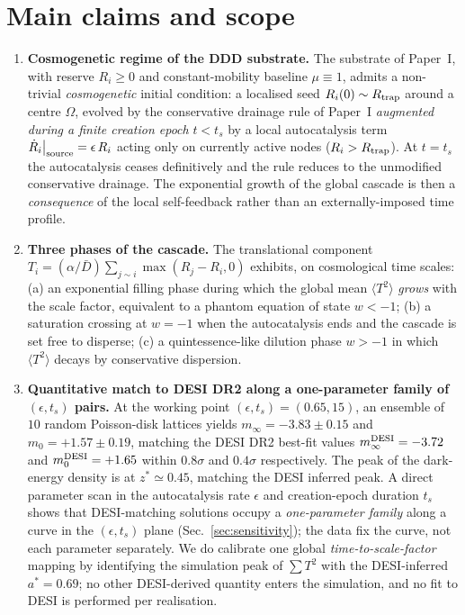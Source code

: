 \documentclass[11pt,a4paper]{article}
\begin{document}
\section{Main claims and scope}
\label{sec:claims}

\begin{enumerate}
\item \textbf{Cosmogenetic regime of the DDD substrate.} The substrate
of Paper~I, with reserve $R_i \geq 0$ and constant-mobility baseline
$\mu \equiv 1$, admits a non-trivial \emph{cosmogenetic} initial
condition: a localised seed $R_i(0) \sim R_{\rm trap}$ around a centre
$\Omega$, evolved by the conservative drainage rule of Paper~I
\emph{augmented during a finite creation epoch} $t < t_s$ by a local
autocatalysis term $\dot R_i\big|_{\rm source} = \epsilon \, R_i$
acting only on currently active nodes ($R_i > R_{\rm trap}$). At
$t = t_s$ the autocatalysis ceases definitively and the rule reduces
to the unmodified conservative drainage. The exponential growth of
the global cascade is then a \emph{consequence} of the local
self-feedback rather than an externally-imposed time profile.

\item \textbf{Three phases of the cascade.}
The translational component $T_i = (\alpha/\bar D)\sum_{j\sim i}
\max(R_j - R_i, 0)$ exhibits, on cosmological time scales:
(a) an exponential filling phase during which the global mean
$\langle T^2\rangle$ \emph{grows} with the scale factor, equivalent to
a phantom equation of state $w < -1$;
(b) a saturation crossing at $w = -1$ when the autocatalysis ends and
the cascade is set free to disperse;
(c) a quintessence-like dilution phase $w > -1$ in which $\langle
T^2\rangle$ decays by conservative dispersion.

\item \textbf{Quantitative match to DESI DR2 along a one-parameter
family of $(\epsilon, t_s)$ pairs.} At the working point
$(\epsilon, t_s) = (0.65, 15)$, an ensemble of $10$ random Poisson-disk
lattices yields $m_\infty = -3.83 \pm 0.15$ and $m_0 = +1.57 \pm 0.19$,
matching the DESI DR2 best-fit values $m_\infty^{\rm DESI} = -3.72$
and $m_0^{\rm DESI} = +1.65$ within $0.8\sigma$ and $0.4\sigma$
respectively. The peak of the dark-energy density is at
$z^\ast \simeq 0.45$, matching the DESI inferred peak. A direct
parameter scan in the autocatalysis rate $\epsilon$ and creation-epoch
duration $t_s$ shows that DESI-matching solutions occupy a
\emph{one-parameter family} along a curve in the $(\epsilon, t_s)$
plane (Sec.~\ref{sec:sensitivity}); the data fix the curve, not each
parameter separately. We do calibrate one global
\emph{time-to-scale-factor} mapping by identifying the simulation
peak of $\sum T^2$ with the DESI-inferred $a^\ast = 0.69$; no other
DESI-derived quantity enters the simulation, and no fit to DESI is
performed per realisation.


\end{enumerate}
\end{document}
